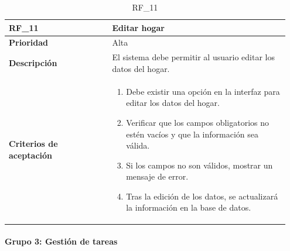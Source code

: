 \begin{table}[htb!]
    \begin{tabular}{|p{0.35\linewidth}|p{0.6\linewidth}|}
        \hline
        \rowcolor[HTML]{C0C0C0}  
        \textbf{RF\_11} & \textbf{Editar hogar} \\ 
        \hline
        \textbf{Prioridad} & Alta \\ 
        \hline
        \textbf{Descripción} & El sistema debe permitir al usuario editar los datos del hogar. \\ 
        \hline
        \vspace{0.5mm}
        \textbf{Criterios de aceptación} & 
        \begin{minipage}[t]{0.9\linewidth}
            \begin{enumerate}
                \item Debe existir una opción en la interfaz para editar los datos del hogar.
                \item Verificar que los campos obligatorios no estén vacíos y que la información sea válida.
                \item Si los campos no son válidos, mostrar un mensaje de error.
                \item Tras la edición de los datos, se actualizará la información en la base de datos.
            \end{enumerate}
            \vspace{2mm}
        \end{minipage} \\ 
        \hline
    \end{tabular}
    \caption{RF\_11}
    \label{req:RF11}
\end{table}


\clearpage

\paragraph{Grupo 3: Gestión de tareas}
\label{subsubsec:grupo3}

\parbox{\textwidth}{ 
   
}

